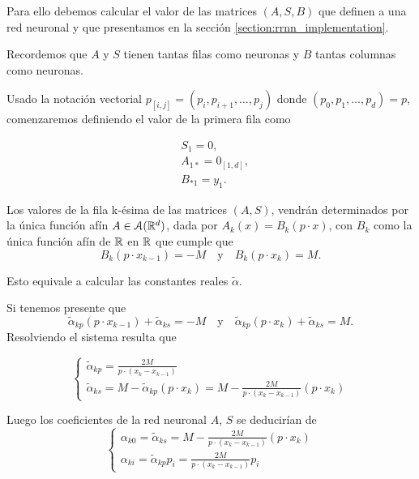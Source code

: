 \begin{aportacionOriginal}
Para ello debemos calcular el valor de las matrices $(A,S,B)$ que definen a una red neuronal y que presentamos en la sección \ref{section:rrnn_implementation}.

Recordemos que $A$ y $S$ tienen tantas filas como neuronas  y $B$ tantas columnas como neuronas. 

Usado la notación vectorial
$p_{[i,j]} = (p_i, p_{i+1}, \ldots, p_{j})$ donde $(p_0, p_1, \ldots, p_d)=p$, comenzaremos definiendo el valor de la primera fila como

\begin{align}
    &S_1 = 0, \\
    & A_{1 *} = 0_{[1,d]}, \\
    & B_{* 1} = y_1.
\end{align}

Los valores de la fila  k-ésima de las matrices $(A,S)$, vendrán determinados por la única función afín $A \in \mathcal{A}(\mathbb{R}^d)$, 
dada por $A_k(x)=B_k(p \cdot x)$, con $B_{k}$ como la única función afín de $\mathbb{R}$ en $\mathbb{R}$ que cumple que 
\begin{equation}
    B_k(p \cdot x_{k-1}) = -M 
    \quad \text{y} \quad 
     B_{k}(p \cdot x_k)= M.
\end{equation}

Esto equivale a calcular las constantes reales $\tilde {\alpha}$. 

Si tenemos presente que 
\begin{equation}
    \tilde{\alpha}_{k p} (p \cdot x_{k-1}) + \tilde{\alpha}_{k s} = -M 
    \quad \text{y} \quad 
    \tilde{\alpha}_{k p}(p \cdot x_k) + \tilde{\alpha}_{k s}= M.
\end{equation} 
Resolviendo el sistema resulta que 

\begin{equation}
    \left\{ 
        \begin{array}{l}
            \tilde{\alpha}_{k p} = \frac{2 M}{p \cdot (x_k - x_{k-1})}
            \\
            \tilde{\alpha}_{k s} 
            = M -  \tilde{\alpha}_{k p}(p \cdot x_{k})
            = M -  \frac{2 M}{p \cdot (x_k - x_{k-1})}(p \cdot x_{k}) 
        \end{array}
    \right.
\end{equation}

Luego los coeficientes de la red neuronal $A$, $S$ se deducirían de 
\begin{equation}
    \left\{ 
        \begin{array}{l}
            \alpha_{k 0} = \tilde{\alpha}_{k s} =
                M -  \frac{2 M}{p \cdot (x_k - x_{k-1})}(p \cdot x_{k})        
            \\
            \alpha_{k i} =  \tilde{\alpha}_{k p} p_{i}
            = 
            \frac{2 M}{p \cdot (x_k - x_{k-1})}
            p_i 
        \end{array}
        \right.
\end{equation}


\end{aportacionOriginal}
